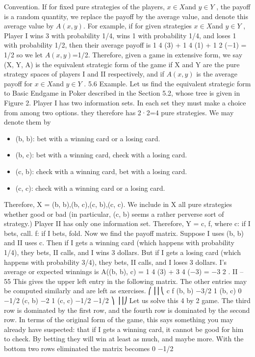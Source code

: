\documentclass[]{report}
\begin{document}
Convention. If for fixed pure strategies of the players, $x \in X $and $y \in Y $ , the payoff is
a random quantity, we replace the payoff by the average value, and denote this average
value by $A(x, y)$.
For example, if for given strategies $x \in X $and $y \in Y $ , Player I wins 3 with probability
1/4, wins 1 with probability 1/4, and loses 1 with probability 1/2, then their average payoff
is 1
4 (3) + 1
4 (1) + 1
2 (−1) = 1/2 so we let $A(x, y)$=1/2.
Therefore, given a game in extensive form, we say (X, Y, A) is the equivalent strategic
form of the game if X and Y are the pure strategy spaces of players I and II respectively,
and if $A(x, y)$ is the average payoff for $x \in X $and $y \in Y $ .
5.6 Example. Let us find the equivalent strategic form to Basic Endgame in Poker
described in the Section 5.2, whose tree is given in Figure 2. Player I has two information
sets. In each set they must make a choice from among two options. they therefore has 2·2=4
pure strategies. We may denote them by
\begin{itemize}
\item (b, b): bet with a winning card or a losing card.
\item (b, c): bet with a winning card, check with a losing card.
\item (c, b): check with a winning card, bet with a losing card.
\item (c, c): check with a winning card or a losing card.
\end{itemize}
Therefore, X = {(b, b),(b, c),(c, b),(c, c)}. We include in X all pure strategies whether
good or bad (in particular, (c, b) seems a rather perverse sort of strategy.)
Player II has only one information set. Therefore, Y = {c, f}, where
c: if I bets, call.
f: if I bets, fold.
Now we find the payoff matrix. Suppose I uses (b, b) and II uses c. Then if I gets a
winning card (which happens with probability 1/4), they bets, II calls, and I wins 3 dollars.
But if I gets a losing card (which happens with probability 3/4), they bets, II calls, and I
loses 3 dollars. I’s average or expected winnings is
A((b, b), c) = 1
4
(3) + 3
4
(−3) = −3
2
.
II – 55
This gives the upper left entry in the following matrix. The other entries may be computed
similarly and are left as exercises.
⎛
⎜⎜⎝
c f
(b, b) −3/2 1
(b, c) 0 −1/2
(c, b) −2 1
(c, c) −1/2 −1/2
⎞
⎟⎟⎠
Let us solve this 4 by 2 game. The third row is dominated by the first row, and the
fourth row is dominated by the second row. In terms of the original form of the game, this
says something you may already have suspected: that if I gets a winning card, it cannot
be good for him to check. By betting they will win at least as much, and maybe more. With
the bottom two rows eliminated the matrix becomes %
0 −1/2
\end{document}
